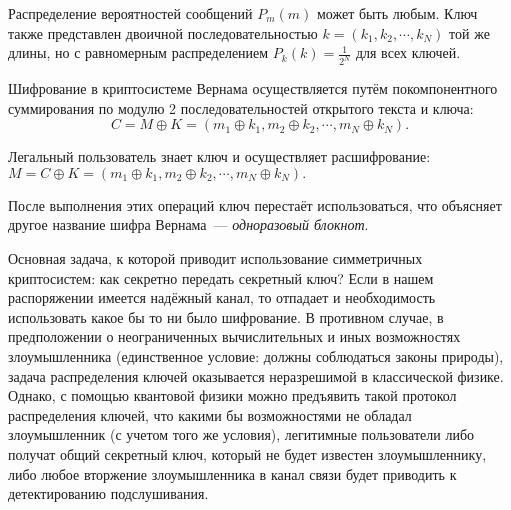 Распределение вероятностей сообщений $P_m(m)$ может быть любым. Ключ также представлен двоичной последовательностью $k =
(k_1, k_2, \cdots, k_N )$ той же длины, но с равномерным распределением $P_k(k) = \frac{1}{2^N}$
для всех ключей.

Шифрование в криптосистеме Вернама осуществляется путём покомпонентного суммирования по модулю 2 последовательностей открытого текста и ключа:
$$C = M \oplus K = (m_1 \oplus k_1, m_2 \oplus k_2, \cdots, m_N \oplus k_N ).$$

Легальный пользователь знает ключ и осуществляет расшифрование:
$M = C \oplus K = (m_1 \oplus k_1, m_2 \oplus k_2, \cdots, m_N \oplus k_N ).$

После выполнения этих операций ключ перестаёт использоваться, что объясняет другое название шифра Вернама~--- \textit{одноразовый блокнот}. 

Основная задача, к которой приводит использование симметричных криптосистем: как секретно передать секретный ключ?
Если в нашем распоряжении имеется надёжный канал, то отпадает и необходимость использовать какое бы то ни было шифрование.
В противном случае, в предположении о неограниченных вычислительных и иных возможностях злоумышленника (единственное условие: должны соблюдаться законы природы),
задача распределения ключей оказывается неразрешимой в классической физике. Однако, с помощью квантовой физики можно предъявить такой протокол распределения ключей, 
что какими бы возможностями не обладал злоумышленник (с учетом того же условия), легитимные пользователи либо получат общий секретный ключ, который не будет известен злоумышленнику,
либо любое вторжение злоумышленника в канал связи будет приводить к детектированию подслушивания.